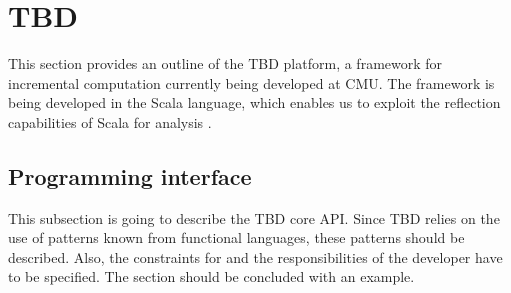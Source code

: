 \section{TBD}
This section provides an outline of the TBD platform, a framework for incremental computation currently being developed at CMU. The framework is being developed in the Scala language, which enables us to exploit the reflection capabilities of Scala for analysis \cite{burmako2013scala}. 

\subsection{Programming interface}
This subsection is going to describe the TBD core API. Since TBD relies on the use of patterns known from functional languages, these patterns should be described. Also, the constraints for and the responsibilities of the developer have to be specified. The section should be concluded with an example. 
